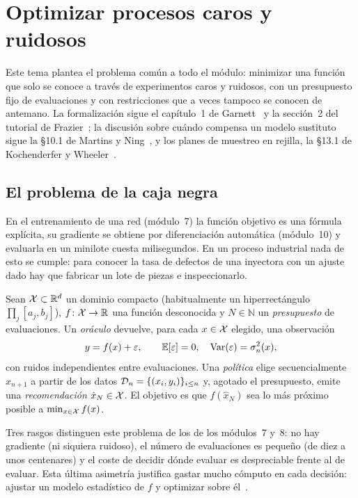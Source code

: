 \chapter{Optimizar procesos caros y ruidosos}
\label{tema:1}

Este tema plantea el problema común a todo el módulo: minimizar una función que solo se conoce a través de experimentos caros y ruidosos, con un presupuesto fijo de evaluaciones y con restricciones que a veces tampoco se conocen de antemano. La formalización sigue el capítulo~1 de Garnett~\cite{garnett} y la sección~2 del tutorial de Frazier~\cite{frazier}; la discusión sobre cuándo compensa un modelo sustituto sigue la §10.1 de Martins y Ning~\cite{mn}, y los planes de muestreo en rejilla, la §13.1 de Kochenderfer y Wheeler~\cite{kw}.

\section{El problema de la caja negra}

En el entrenamiento de una red (módulo~7) la función objetivo es una fórmula explícita, su gradiente se obtiene por diferenciación automática (módulo~10) y evaluarla en un minilote cuesta milisegundos. En un proceso industrial nada de esto se cumple: para conocer la tasa de defectos de una inyectora con un ajuste dado hay que fabricar un lote de piezas e inspeccionarlo.

\begin{definicion}\label{def:cajanegra}
Sean $\mathcal{X}\subset\mathbb{R}^{d}$ un dominio compacto (habitualmente un hiperrectángulo $\prod_{j}[a_j,b_j]$), $f\colon\mathcal{X}\to\mathbb{R}$ una función desconocida y $N\in\mathbb{N}$ un \emph{presupuesto} de evaluaciones. Un \emph{oráculo} devuelve, para cada $x\in\mathcal{X}$ elegido, una observación
\[
y=f(x)+\varepsilon,\qquad \mathbb{E}[\varepsilon]=0,\quad \operatorname{Var}(\varepsilon)=\sigma_n^2(x),
\]
con ruidos independientes entre evaluaciones. Una \emph{política} elige secuencialmente $x_{n+1}$ a partir de los datos $\mathcal{D}_n=\{(x_i,y_i)\}_{i\le n}$ y, agotado el presupuesto, emite una \emph{recomendación} $\hat x_N\in\mathcal{X}$. El objetivo es que $f(\hat x_N)$ sea lo más próximo posible a $\min_{x\in\mathcal{X}}f(x)$.
\end{definicion}

Tres rasgos distinguen este problema de los de los módulos~7 y~8: no hay gradiente (ni siquiera ruidoso), el número de evaluaciones es pequeño (de diez a unos centenares) y el coste de decidir dónde evaluar es despreciable frente al de evaluar. Esta última asimetría justifica gastar mucho cómputo en cada decisión: ajustar un modelo estadístico de $f$ y optimizar sobre él~\cite[§1.1]{garnett}.

